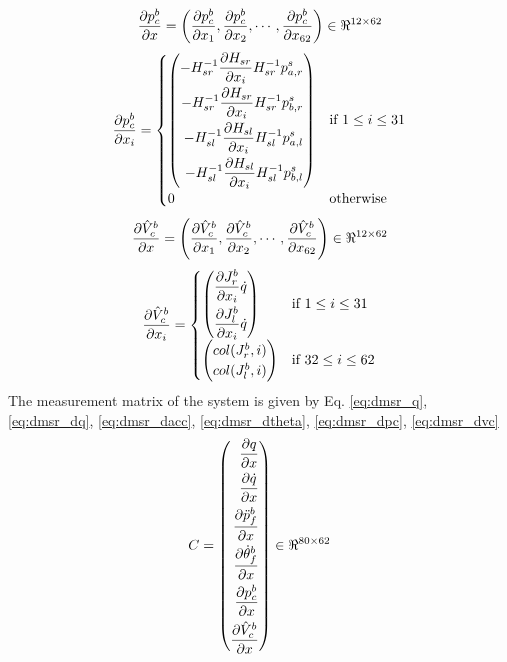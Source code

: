 \begin{equation}
\label{eq:dmsr_dpc}
\frac{\partial {p_{c}^{b}}}{\partial {x}} = \left(\frac{\partial {p_{c}^{b}}}{\partial {x_{1}}}, \frac{\partial {p_{c}^{b}}}{\partial {x_{2}}}, \cdots , \frac{\partial {p_{c}^{b}}}{\partial {x_{62}}}\right) \in \Re^{12 \times 62}
\end{equation}
\[
\frac{\partial {p_{c}^{b}}}{\partial {x_{i}}} =
\begin{cases}
\left(
\begin{aligned}
-H_{sr}^{-1}\frac{\partial {H_{sr}}}{\partial {x_{i}}}H_{sr}^{-1}p_{a,r}^{s} \\
-H_{sr}^{-1}\frac{\partial {H_{sr}}}{\partial {x_{i}}}H_{sr}^{-1}p_{b,r}^{s} \\
-H_{sl}^{-1}\frac{\partial {H_{sl}}}{\partial {x_{i}}}H_{sl}^{-1}p_{a,l}^{s} \\
-H_{sl}^{-1}\frac{\partial {H_{sl}}}{\partial {x_{i}}}H_{sl}^{-1}p_{b,l}^{s}
\end{aligned} \right)
& \text{if } 1 \leq i \leq 31 \\
0 &\text{otherwise}
\end{cases}
\]
 \begin{equation}
 \label{eq:dmsr_dvc}
\frac{\partial {\hat{V}_{c}^{b}}}{\partial {x}} = \left(\frac{\partial {\hat{V}_{c}^{b}}}{\partial {x_{1}}}, \frac{\partial {\hat{V}_{c}^{b}}}{\partial {x_{2}}}, \cdots , \frac{\partial {\hat{V}_{c}^{b}}}{\partial {x_{62}}}\right) \in \Re^{12 \times 62}
\end{equation}
\[
\frac{\partial {\hat{V}_{c}^{b}}}{\partial {x_{i}}} = 
	\begin{cases}
	\left(
	\begin{aligned}
	\frac{\partial {J_{r}^{b}}}{\partial {x_{i}}}\dot{q} \\
	\frac{\partial {J_{l}^{b}}}{\partial {x_{i}}}\dot{q} \\
	\end{aligned} \right)
	& \text{if } 1 \leq i \leq 31 \\
	\begin{pmatrix}
	col(J_{r}^{b},i)\\ col(J_{l}^{b},i)
	\end{pmatrix}
	 	& \text{if } 32 \leq i \leq 62
	\end{cases}
\]
The measurement matrix of the system is given by Eq. \ref{eq:dmsr_q}, \ref{eq:dmsr_dq}, \ref{eq:dmsr_dacc}, \ref{eq:dmsr_dtheta}, \ref{eq:dmsr_dpc}, \ref{eq:dmsr_dvc}
\begin{equation}
C = \left(
   \begin{aligned}
   \frac{\partial {q}}{\partial {x}} \\
	 \frac{\partial {\dot{q}}}{\partial {x}}\\
	 \frac{\partial {\ddot{p}_{f}^{b}}}{\partial {x}}\\
	 \frac{\partial {\dot{\theta}_{f}^{b}}}{\partial {x}}\\
	 \frac{\partial {p_{c}^{b}}}{\partial {x}}\\
	 \frac{\partial {\hat{V}_{c}^{b}}}{\partial {x}} 
   \end{aligned}
	 \right) \in \Re^{80 \times 62}
\end{equation}


